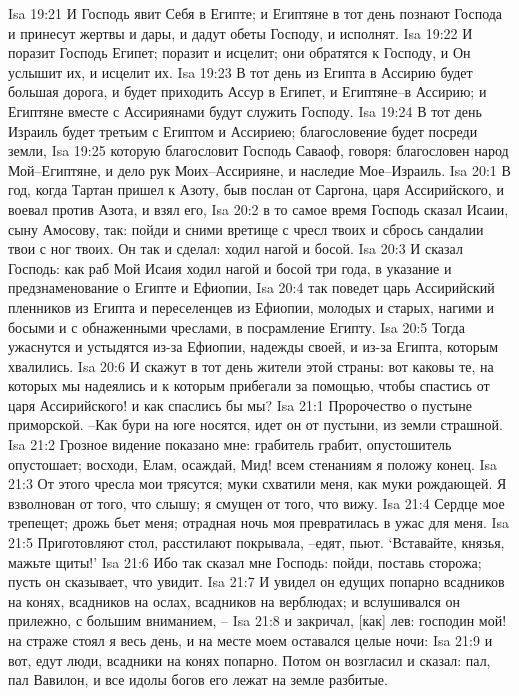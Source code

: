Isa 19:21  И Господь явит Себя в Египте; и Египтяне в тот день познают Господа и принесут жертвы и дары, и дадут обеты Господу, и исполнят.
Isa 19:22  И поразит Господь Египет; поразит и исцелит; они обратятся к Господу, и Он услышит их, и исцелит их.
Isa 19:23  В тот день из Египта в Ассирию будет большая дорога, и будет приходить Ассур в Египет, и Египтяне--в Ассирию; и Египтяне вместе с Ассириянами будут служить Господу.
Isa 19:24  В тот день Израиль будет третьим с Египтом и Ассириею; благословение будет посреди земли,
Isa 19:25  которую благословит Господь Саваоф, говоря: благословен народ Мой--Египтяне, и дело рук Моих--Ассирияне, и наследие Мое--Израиль.
Isa 20:1  В год, когда Тартан пришел к Азоту, быв послан от Саргона, царя Ассирийского, и воевал против Азота, и взял его,
Isa 20:2  в то самое время Господь сказал Исаии, сыну Амосову, так: пойди и сними вретище с чресл твоих и сбрось сандалии твои с ног твоих. Он так и сделал: ходил нагой и босой.
Isa 20:3  И сказал Господь: как раб Мой Исаия ходил нагой и босой три года, в указание и предзнаменование о Египте и Ефиопии,
Isa 20:4  так поведет царь Ассирийский пленников из Египта и переселенцев из Ефиопии, молодых и старых, нагими и босыми и с обнаженными чреслами, в посрамление Египту.
Isa 20:5  Тогда ужаснутся и устыдятся из-за Ефиопии, надежды своей, и из-за Египта, которым хвалились.
Isa 20:6  И скажут в тот день жители этой страны: вот каковы те, на которых мы надеялись и к которым прибегали за помощью, чтобы спастись от царя Ассирийского! и как спаслись бы мы?
Isa 21:1  Пророчество о пустыне приморской. --Как бури на юге носятся, идет он от пустыни, из земли страшной.
Isa 21:2  Грозное видение показано мне: грабитель грабит, опустошитель опустошает; восходи, Елам, осаждай, Мид! всем стенаниям я положу конец.
Isa 21:3  От этого чресла мои трясутся; муки схватили меня, как муки рождающей. Я взволнован от того, что слышу; я смущен от того, что вижу.
Isa 21:4  Сердце мое трепещет; дрожь бьет меня; отрадная ночь моя превратилась в ужас для меня.
Isa 21:5  Приготовляют стол, расстилают покрывала, --едят, пьют. `Вставайте, князья, мажьте щиты!'
Isa 21:6  Ибо так сказал мне Господь: пойди, поставь сторожа; пусть он сказывает, что увидит.
Isa 21:7  И увидел он едущих попарно всадников на конях, всадников на ослах, всадников на верблюдах; и вслушивался он прилежно, с большим вниманием, --
Isa 21:8  и закричал, [как] лев: господин мой! на страже стоял я весь день, и на месте моем оставался целые ночи:
Isa 21:9  и вот, едут люди, всадники на конях попарно. Потом он возгласил и сказал: пал, пал Вавилон, и все идолы богов его лежат на земле разбитые.

